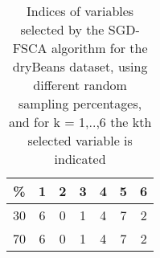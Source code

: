 \begin{table}
	\begin{center}
		\begin{tabular}{c c c c c c c}
			\% & 1 & 2 & 3 & 4 & 5 & 6 \\
			\hline
			30 & 6 & 0 & 1 & 4 & 7 & 2 \\
			70 & 6 & 0 & 1 & 4 & 7 & 2 \\
		\end{tabular}
	\end{center}
	\caption{Indices of variables selected by the SGD-FSCA algorithm for the dryBeans dataset, using different random sampling percentages, and for k = 1,..,6 the kth selected variable is indicated}
\end{table}